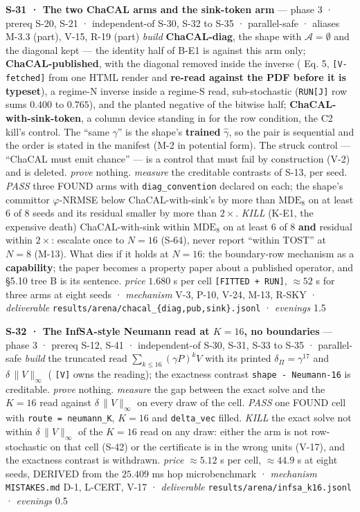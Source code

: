 \documentclass[11pt,a4paper]{article}
\theoremstyle{plain}
\theoremstyle{definition}
\theoremstyle{remark}
\begin{document}
\textbf{S-31 · The two ChaCAL arms and the sink-token arm} --- phase 3 ·
prereq S-20, S-21 · independent-of S-30, S-32 to S-35 · parallel-safe ·
aliases M-3.3 (part), V-15, R-19 (part) \emph{build}
\textbf{ChaCAL-diag}, the shape with \(\mathcal{A}=\emptyset\) and the
diagonal kept --- the identity half of B-E1 is against this arm only;
\textbf{ChaCAL-published}, with the diagonal removed inside the inverse
(\citep{fagnou-2024-chacal} Eq. 5, \texttt{{[}V-fetched{]}} from one
HTML render and \textbf{re-read against the PDF before it is typeset}),
a regime-N inverse inside a regime-S read, sub-stochastic
(\texttt{RUN{[}J{]}} row sums \(0.400\) to \(0.765\)), and the planted
negative of the bitwise half; \textbf{ChaCAL-with-sink-token}, a column
device standing in for the row condition, the C2 kill's control. The
``same \(\gamma\)'' is the shape's \textbf{trained} \(\hat\gamma\), so
the pair is sequential and the order is stated in the manifest (M-2 in
potential form). The struck control --- ``ChaCAL must emit chance'' ---
is a control that must fail by construction (V-2) and is deleted.
\emph{prove} nothing. \emph{measure} the creditable contrasts of S-13,
per seed. \emph{PASS} three FOUND arms with \texttt{diag\_convention}
declared on each; the shape's committor \(\varphi\)-NRMSE below
ChaCAL-with-sink's by more than \(\mathrm{MDE}_8\) on at least 6 of 8
seeds and its residual smaller by more than \(2\times\). \emph{KILL}
(K-E1, the expensive death) ChaCAL-with-sink within \(\mathrm{MDE}_8\)
on at least 6 of 8 \textbf{and} residual within \(2\times\): escalate
once to \(N=16\) (S-64), never report ``within TOST'' at \(N=8\) (M-13).
What dies if it holds at \(N=16\): the boundary-row mechanism as a
\textbf{capability}; the paper becomes a property paper about a
published operator, and §5.10 tree B is its sentence. \emph{price}
\(1.680\) s per cell \texttt{{[}FITTED\ +\ RUN{]}}, \(\approx52\) s for
three arms at eight seeds · \emph{mechanism} V-3, P-10, V-24, M-13,
R-SKY · \emph{deliverable}
\texttt{results/arena/chacal\_\{diag,pub,sink\}.jsonl} · \emph{evenings}
1.5

\textbf{S-32 · The InfSA-style Neumann read at \(K=16\), no boundaries}
--- phase 3 · prereq S-12, S-41 · independent-of S-30, S-31, S-33 to
S-35 · parallel-safe \emph{build} the truncated read
\(\sum_{k\le16}(\gamma P)^kV\) with its printed
\(\delta_\Pi=\gamma^{17}\) and \(\delta\,\|V\|_\infty\)
(\citep{roffo-2026-infsa} \texttt{{[}V{]}} owns the reading); the
exactness contrast \texttt{shape\ -\ Neumann-16} is creditable.
\emph{prove} nothing. \emph{measure} the gap between the exact solve and
the \(K=16\) read against \(\delta\,\|V\|_\infty\) on every draw of the
cell. \emph{PASS} one FOUND cell with \texttt{route\ =\ neumann\_K},
\(K=16\) and \texttt{delta\_vec} filled. \emph{KILL} the exact solve not
within \(\delta\,\|V\|_\infty\) of the \(K=16\) read on any draw: either
the arm is not row-stochastic on that cell (S-42) or the certificate is
in the wrong units (V-17), and the exactness contrast is withdrawn.
\emph{price} \(\approx5.12\) s per cell, \(\approx44.9\) s at eight
seeds, DERIVED from the \(25.409\) ms hop microbenchmark ·
\emph{mechanism} \texttt{MISTAKES.md} D-1, L-CERT, V-17 ·
\emph{deliverable} \texttt{results/arena/infsa\_k16.jsonl} ·
\emph{evenings} 0.5
\end{document}
